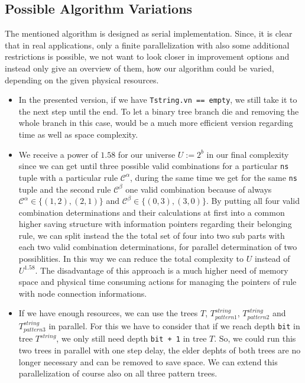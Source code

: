 \subsection{Possible Algorithm Variations}
\label{ss:possiblealgorithmvariations}
The mentioned algorithm is designed as serial implementation. Since, it is clear that in real applications, only a finite parallelization with also some additional restrictions is possible, we not want to look closer in improvement options and instead only give an overview of them, how our algorithm could be varied, depending on the given physical resources.

\begin{itemize}
    \item In the presented version, if we have \texttt{Tstring.vn == empty}, we still take it to the next step until the end. To let a binary tree branch die and removing the whole branch in this case, would be a much more efficient version regarding time as well as space complexity.
    \item We receive a power of $1.58$ for our universe $U := 2^{b}$ in our final complexity since we can get until three possible valid combinations for a particular \texttt{ns} tuple with a particular rule $\mathcal{C}^{\alpha}$, during the same time we get for the same \texttt{ns} tuple and the second rule $\mathcal{C}^{\beta}$ one valid combination because of always $\mathcal{C}^{\alpha} \in \{ \left(1,2\right), \left(2,1\right) \}$ and $\mathcal{C}^{\beta} \in \{ \left(0,3\right), \left(3,0\right) \}$. By putting all four valid combination determinations and their calculations at first into a common higher saving structure with information pointers regarding their belonging rule, we can split instead the the total set of four into two sub parts with each two valid combination determinations, for parallel determination of two possiblities. In this way we can reduce the total complexity to $U$ instead of $U^{1.58}$. The disadvantage of this approach is a much higher need of memory space and physical time consuming actions for managing the pointers of rule with node connection informations.
    \item If we have enough resources, we can use the trees $T$, $T^{string}_{pattern1}$, $T^{string}_{pattern2}$ and $T^{string}_{pattern3}$ in parallel. For this we have to consider that if we reach depth \texttt{bit} in tree $T^{string}$, we only still need depth \texttt{bit + 1} in tree $T$. So, we could run this two trees in parallel with one step delay, the elder dephts of both trees are no longer necessary and can be removed to save space. We can extend this parallelization of course also on all three pattern trees.
\label{itemize:possiblealgorithmvariations}
\end{itemize}
